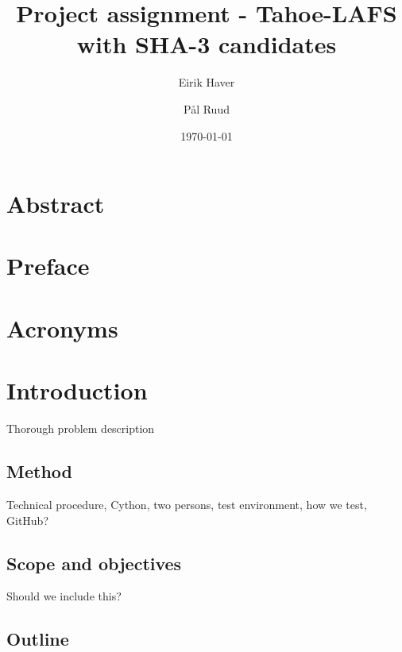 \documentclass[english,12pt,a4paper]{book}
\author{Eirik Haver \and Pål Ruud}
\title{Project assignment - Tahoe-LAFS with SHA-3 candidates}
\date{\today}
\begin{document}

\pagestyle{empty}

\chapter*{Abstract}
\pagestyle{plain}
\setcounter{page}{1}

\chapter*{Preface}

\tableofcontents

\listoffigures

\listoftables

\chapter*{Acronyms}

\begin{acronym}
\end{acronym}

\chapter{Introduction}
\setcounter{page}{1}

Thorough problem description

\section{Method}

Technical procedure, Cython, two persons, test environment, how we test,
GitHub?

\section{Scope and objectives}

Should we include this?

\section{Outline}
\end{document}
